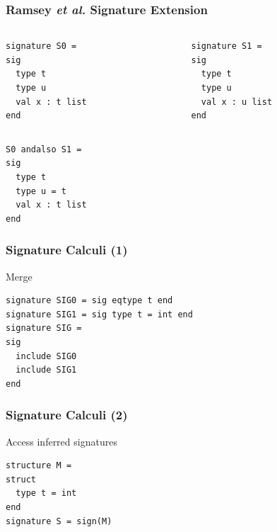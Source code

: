\documentclass{beamer}
\begin{document}
\begin{frame}[fragile]
\frametitle{Ramsey {\it et al.} Signature Extension}

\begin{columns}
	\begin{column}{3cm}
\begin{lstlisting}[frame=none]
signature S0 =
sig
  type t
  type u 
  val x : t list
end
\end{lstlisting}
\end{column}
\begin{column}{3cm}
\begin{lstlisting}[frame=none]
signature S1 = 
sig
  type t
  type u 
  val x : u list
end	
\end{lstlisting}
\end{column}
\end{columns}

\begin{lstlisting}[frame=none]
S0 andalso S1 =	
sig
  type t 
  type u = t
  val x : t list
end	
\end{lstlisting}	
\end{frame}

\begin{frame}[fragile]
\frametitle{Signature Calculi (1)}	
\begin{block}{Merge}
\begin{lstlisting}
signature SIG0 = sig eqtype t end
signature SIG1 = sig type t = int end
signature SIG = 
sig 
  include SIG0
  include SIG1
end
\end{lstlisting}
\end{block}
\end{frame}

\begin{frame}[fragile]
\frametitle{Signature Calculi (2)}
\begin{block}{Access inferred signatures}
\begin{lstlisting}
structure M = 
struct 
  type t = int
end
signature S = sign(M)	
\end{lstlisting}	
\end{block}
\end{frame}
\end{document}
